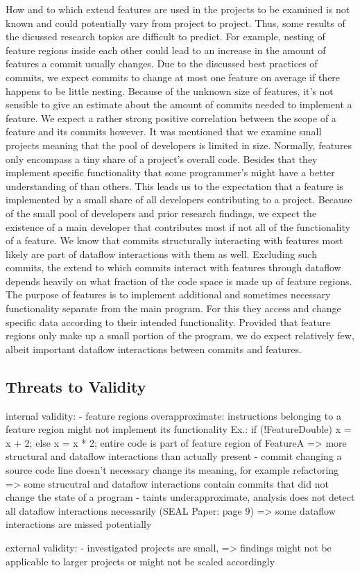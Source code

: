 How and to which extend features are used in the projects to be examined is not known and could potentially vary from project to project.
Thus, some results of the dicussed research topics are difficult to predict.
For example, nesting of feature regions inside each other could lead to an increase in the amount of features a commit usually changes.
Due to the discussed best practices of commits, we expect commits to change at most one feature on average if there happens to be little nesting.
Because of the unknown size of features, it's not sensible to give an estimate about the amount of commits needed to implement a feature.
We expect a rather strong positive correlation between the scope of a feature and its commits however.
It was mentioned that we examine small projects meaning that the pool of developers is limited in size. 
Normally, features only encompass a tiny share of a project's overall code. 
Besides that they implement specific functionality that some programmer's might have a better understanding of than others.
This leads us to the expectation that a feature is implemented by a small share of all developers contributing to a project.
Because of the small pool of developers and prior research findings, we expect the existence of a main developer that contributes most if not all of the functionality of a feature.
We know that commits structurally interacting with features most likely are part of dataflow interactions with them as well.
Excluding such commits, the extend to which commits interact with features through dataflow depends heavily on what fraction of the code space is made up of feature regions.
The purpose of features is to implement additional and sometimes necessary functionality separate from the main program.
For this they access and change specific data according to their intended functionality.
Provided that feature regions only make up a small portion of the program, we do expect relatively few, albeit important dataflow interactions between commits and features.

\subsection*{Threats to Validity}\label{sec:threats}

internal validity:
	- feature regions overapproximate: instructions belonging to a feature region might not implement its functionality
		Ex.: 	if (!FeatureDouble) {
				x = x + 2;
			} else {
				x = x * 2;
			}
		entire code is part of feature region of FeatureA
		=> more structural and dataflow interactions than actually present
	- commit changing a source code line doesn't necessary change its meaning, for example refactoring
		=> some strucutral and dataflow interactions contain commits that did not change the state of a program
	- taints underapproximate, analysis does not detect all dataflow interactions necessarily (SEAL Paper: page 9)
		=> some dataflow interactions are missed potentially 

external validity:
	- investigated projects are small,
		=> findings might not be applicable to larger projects or might not be scaled accordingly
	




